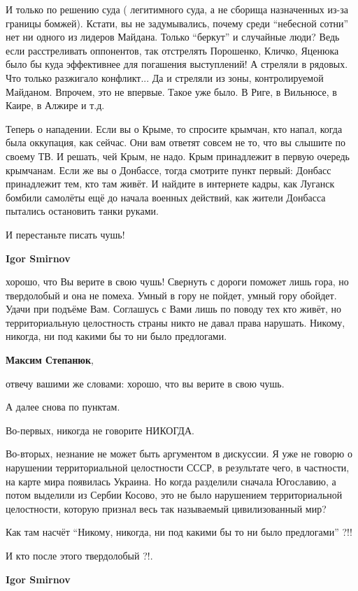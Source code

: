 \begin{itemize}
\begin{itemize}
И только по решению суда ( легитимного суда, а не сборища назначенных из-за
границы бомжей). Кстати, вы не задумывались, почему среди \enquote{небесной сотни} нет
ни одного из лидеров Майдана. Только \enquote{беркут} и случайные люди? Ведь если
расстреливать оппонентов, так отстрелять Порошенко, Кличко, Яценюка было бы
куда эффективнее для погашения выступлений! А стреляли в рядовых. Что только
разжигало конфликт... Да и стреляли из зоны, контролируемой Майданом. Впрочем,
это не впервые. Такое уже было. В Риге, в Вильнюсе, в Каире, в Алжире и т.д.

Теперь о нападении. Если вы о Крыме, то спросите крымчан, кто напал, когда была
оккупация, как сейчас. Они вам ответят совсем не то, что вы слышите по своему
ТВ. И решать, чей Крым, не надо. Крым принадлежит в первую очередь крымчанам.
Если же вы о Донбассе, тогда смотрите пункт первый: Донбасс принадлежит тем,
кто там живёт. И найдите в интернете кадры, как Луганск бомбили самолёты ещё до
начала военных действий, как жители Донбасса пытались остановить танки руками.

И перестаньте писать чушь!

\textbf{Igor Smirnov} 

хорошо, что Вы верите в свою чушь! Свернуть с дороги поможет лишь гора, но
твердолобый и она не помеха. Умный в гору не пойдет, умный гору обойдет. Удачи
при подъёме Вам. Соглашусь с Вами лишь по поводу тех кто живёт, но
территориальную целостность страны никто не давал права нарушать. Никому,
никогда, ни под какими бы то ни было предлогами.

\textbf{Максим Степанюк}, 

отвечу вашими же словами: хорошо, что вы верите в свою чушь.

А далее снова по пунктам.

Во-первых, никогда не говорите НИКОГДА.

Во-вторых, незнание не может быть аргументом в дискуссии. Я уже не говорю о
нарушении территориальной целостности СССР, в результате чего, в частности, на
карте мира появилась Украина. Но когда разделили сначала Югославию, а потом
выделили из Сербии Косово, это не было нарушением территориальной целостности,
которую признал весь так называемый цивилизованный мир?

Как там насчёт \enquote{Никому, никогда, ни под какими бы то ни было предлогами} ?!!

И кто после этого твердолобый ?!.

\textbf{Igor Smirnov} 


\end{itemize}
\end{itemize}
